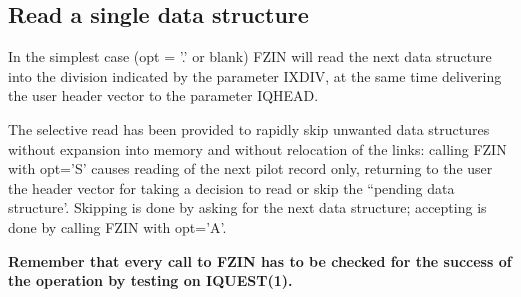 \subsection{Read a single data structure}
\par In the simplest case (opt = '.' or blank) FZIN will read the next
data structure into the division indicated by the parameter IXDIV,
at the same time delivering the user header vector to the
parameter IQHEAD.
\par The selective read has been provided to rapidly skip unwanted
data structures without expansion into memory and without relocation
of the links:
calling FZIN with opt='S' causes reading of the next pilot record
only, returning to the user the header vector for taking a
decision to read or skip the ``pending data structure'.
Skipping is done by asking for the next data structure;
accepting is done by calling FZIN with opt='A'.
\par {\bf Remember
that every call to FZIN has to be checked for the success of
the operation by testing on IQUEST(1).}
